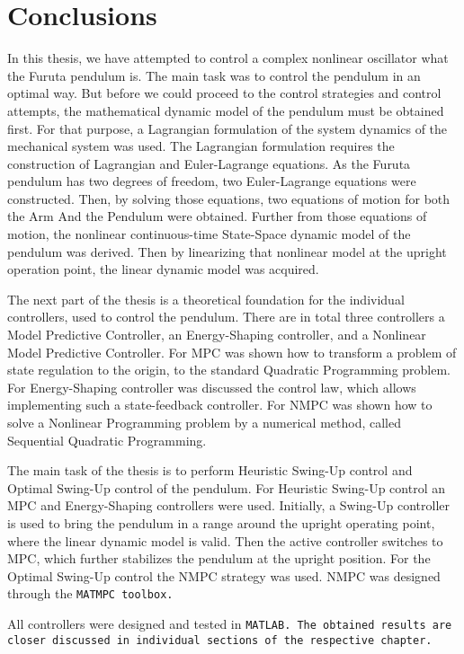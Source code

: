 \chapter{Conclusions}
In this thesis, we have attempted to control a complex nonlinear oscillator what the Furuta pendulum is. The main task was to control the pendulum in an optimal way. But before we could proceed to the control strategies and control attempts, the mathematical dynamic model of the pendulum must be obtained first. For that purpose, a Lagrangian formulation of the system dynamics of the mechanical system was used. The Lagrangian formulation requires the construction of Lagrangian and Euler-Lagrange equations. As the Furuta pendulum has two degrees of freedom, two Euler-Lagrange equations were constructed. Then, by solving those equations, two equations of motion for both the Arm And the Pendulum were obtained. Further from those equations of motion, the nonlinear continuous-time State-Space dynamic model of the pendulum was derived. Then by linearizing that nonlinear model at the upright operation point, the linear dynamic model was acquired.

The next part of the thesis is a theoretical foundation for the individual controllers, used to control the pendulum. There are in total three controllers a Model Predictive Controller, an Energy-Shaping controller, and a Nonlinear Model Predictive Controller. For MPC was shown how to transform a problem of state regulation to the origin, to the standard Quadratic Programming problem. For Energy-Shaping controller was discussed the control law, which allows implementing such a state-feedback controller. For NMPC was shown how to solve a Nonlinear Programming problem by a numerical method, called Sequential Quadratic Programming.

The main task of the thesis is to perform Heuristic Swing-Up control and Optimal Swing-Up control of the pendulum. For Heuristic Swing-Up control an MPC and Energy-Shaping controllers were used. Initially, a Swing-Up controller is used to bring the pendulum in a range around the upright operating point, where the linear dynamic model is valid. Then the active controller switches to MPC, which further stabilizes the pendulum at the upright position. For the Optimal Swing-Up control the NMPC strategy was used. NMPC was designed through the \tt{MATMPC} toolbox.

All controllers were designed and tested in \tt{MATLAB}. The obtained results are closer discussed in individual sections of the respective chapter.